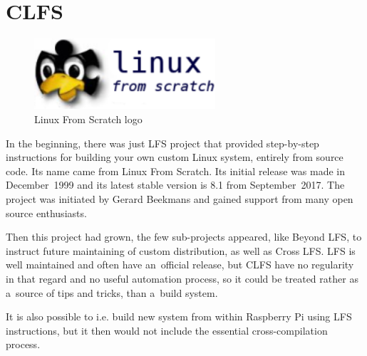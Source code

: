 \documentclass[printmode]{mgr}
\begin{document}


\section{CLFS}

\begin{figure}[htbp]
  \centering
    \includegraphics[width=0.6\textwidth]{lfs-logo.png}
    \caption{Linux From Scratch logo}
  \label{fig:lfs-logo}
\end{figure}


In the beginning, there was just LFS project that provided step-by-step instructions for building your own custom Linux system, entirely from source code.
Its name came from Linux From Scratch.
Its initial release was made in December~1999 and its latest stable version is 8.1 from September~2017. The project was initiated by Gerard Beekmans and gained support from many open source enthusiasts.

Then this project had grown, the few sub-projects appeared, like Beyond LFS, to instruct future maintaining of custom distribution, as well as Cross LFS.
LFS is well maintained and often have an~official release, but CLFS have no regularity in that regard and no useful automation process, so it could be treated rather as a~source of tips and tricks, than a~build system.

It is also possible to i.e. build new system from within Raspberry Pi using LFS instructions, but it then would not include the essential cross-compilation process.


\end{document}

